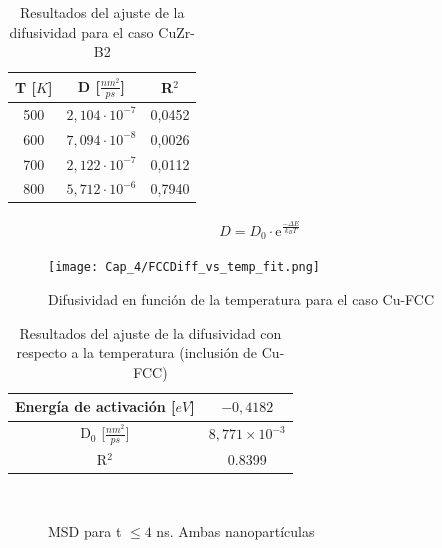 \begin{table}[htp]
\begin{center}
\begin{tabular}{*{3}{c}}
\hline
T [$K$] & D [$\frac{nm^{2}}{ps}$] & R$^{2}$ \\
\hline \hline
500 & $2,104\cdot 10^{-7}$ & 0,0452 \\
\hline
600 & $7,094\cdot 10^{-8}$ & 0,0026 \\
\hline
700 & $2,122\cdot 10^{-7}$ & 0,0112 \\
\hline
800 & $5,712\cdot 10^{-6}$ & 0,7940 \\
\hline
\end{tabular}
\end{center}
\caption{Resultados del ajuste de la difusividad para el caso CuZr-B2}
\label{C4:tb:B2_Diff_Fit_Restults}
\end{table}

\begin{eqnarray}
D = D_{0}\cdot \mathrm{e}^{\frac{-\Delta E}{k_{B} T}}
\label{C4:eq:diff_Fit}
\end{eqnarray}

\begin{figure}[htp]
\centering
\texttt{[image: Cap\_4/FCCDiff\_vs\_temp\_fit.png]}
\caption[Difusividad en función de la temperatura (Cu-FCC)]{Difusividad en función de la temperatura para el caso Cu-FCC}
\label{C4:fg:FCC_diff_vs_T}
\end{figure}

\begin{table}[htp]
\begin{center}
\begin{tabular}{*{2}{c}}
\hline
Energía de activación [$eV$]& $-0,4182$ \\
\hline \hline
D$_{0}$ [$\frac{nm^{2}}{ps}$] & $8,771\times 10^{-3}$\\
\hline
R$^{2}$ & 0.8399 \\
\hline
\end{tabular}
\end{center}
\caption{Resultados del ajuste de la difusividad con respecto a la temperatura (inclusión de Cu-FCC)}
\label{C4:tb:FCC_Diff_VS_T_Fit_Restults}
\end{table}

\begin{figure}[htp]
\centering
{}
\\
\caption[MSD para t $ \leq 4 $ ns. Ambas nanopartículas]{MSD para t $ \leq 4 $ ns. Ambas nanopartículas}
\label{C4:fg:heating_FCC_B2}
\end{figure}

